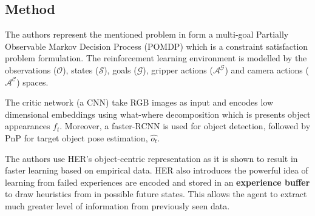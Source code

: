 \documentclass[11pt]{article}
\begin{document}
      \subsection{Method}
      The authors represent the mentioned problem in form a multi-goal Partially
      Observable Markov Decision Process (POMDP) which is a constraint satisfaction
      problem formulation. The reinforcement learning environment is modelled by the
      observations ($\mathcal{O}$), states ($\mathcal{S}$), goals ($\mathcal{G}$),
      gripper actions ($\mathcal{A^G}$) and camera actions ($\mathcal{A^C}$) spaces.

      The critic network (a CNN) take RGB images as input and encodes low dimensional
      embeddings using what-where decomposition which is presents object appearances
      $f_t$.
      Moreover, a faster-RCNN \cite{ren2015faster} is used for object detection,
      followed by PnP for target object pose estimation, $\hat{o_t}$.

      The authors use HER's \cite{andrychowicz2017hindsight} object-centric
      representation as it is shown to result in faster learning based on empirical
      data. HER also introduces the powerful idea of learning from failed experiences
      are encoded and stored in an \textbf{experience buffer} to draw heuristics from
      in possible future states. This allows the agent to extract much greater level
      of information from previously seen data.
\end{document}
